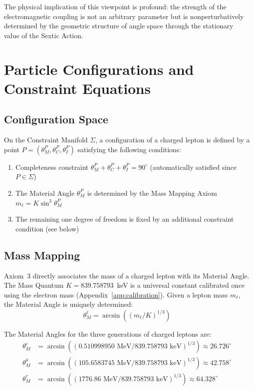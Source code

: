 \documentclass[aps,prd,reprint,nofootinbib]{revtex4-2}
\begin{document}
The physical implication of this viewpoint is profound: the strength of the electromagnetic coupling is not an arbitrary parameter but is nonperturbatively determined by the geometric structure of angle space through the stationary value of the Sextic Action.

\section{Particle Configurations and Constraint Equations}
\label{sec:config}

\subsection{Configuration Space}

On the Constraint Manifold $\Sigma$, a configuration of a charged lepton is defined by a point $P = (\theta_M^P, \theta_C^P, \theta_I^P)$ satisfying the following conditions:
\begin{enumerate}
\item Completeness constraint $\theta_M^P + \theta_C^P + \theta_I^P = 90^\circ$ (automatically satisfied since $P \in \Sigma$)
\item The Material Angle $\theta_M^P$ is determined by the Mass Mapping Axiom $m_\ell = K\sin^3\theta_M^P$
\item The remaining one degree of freedom is fixed by an additional constraint condition (see below)
\end{enumerate}

\subsection{Mass Mapping}

Axiom~3 directly associates the mass of a charged lepton with its Material Angle. The Mass Quantum $K = 839.758793$~keV is a universal constant calibrated once using the electron mass (Appendix~\ref{app:calibration}). Given a lepton mass $m_\ell$, the Material Angle is uniquely determined:
\begin{equation}
\theta_M^\ell = \arcsin\left((m_\ell/K)^{1/3}\right) \label{eq:massmap}
\end{equation}

The Material Angles for the three generations of charged leptons are:
\begin{align}
\theta_M^e &= \arcsin((0.510998950 \text{ MeV}/839.758793 \text{ keV})^{1/3}) \approx 26.726^\circ \\
\theta_M^\mu &= \arcsin((105.6583745 \text{ MeV}/839.758793 \text{ keV})^{1/3}) \approx 42.758^\circ \\
\theta_M^\tau &= \arcsin((1776.86 \text{ MeV}/839.758793 \text{ keV})^{1/3}) \approx 64.328^\circ \label{eq:thetas}
\end{align}
\end{document}
